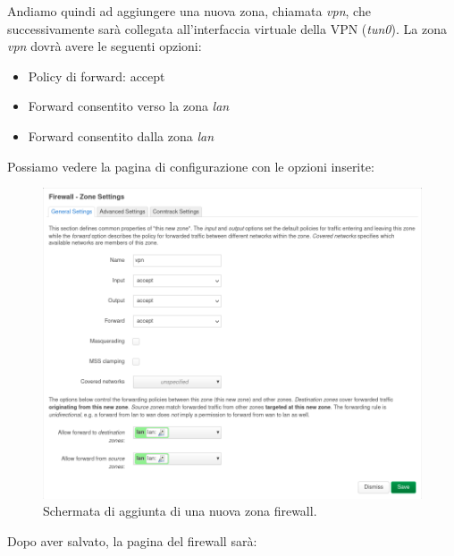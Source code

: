 \newpage
Andiamo quindi ad aggiungere una nuova zona, chiamata \textit{vpn}, che successivamente sarà collegata all'interfaccia virtuale della VPN (\textit{tun0}). La zona \textit{vpn} dovrà avere le seguenti opzioni:

\begin{itemize}[nosep]
    \item Policy di forward: accept
    \item Forward consentito verso la zona \textit{lan}
    \item Forward consentito dalla zona \textit{lan}
\end{itemize}

Possiamo vedere la pagina di configurazione con le opzioni inserite:

\begin{figure}[H]
    \centering
    \includegraphics[width=1\linewidth]{immagini/LuCI_firewall_vpn1}
    \caption{Schermata di aggiunta di una nuova zona firewall.}
    \label{fig:luci-firewall-vpn}
\end{figure}

\newpage
Dopo aver salvato, la pagina del firewall sarà:

